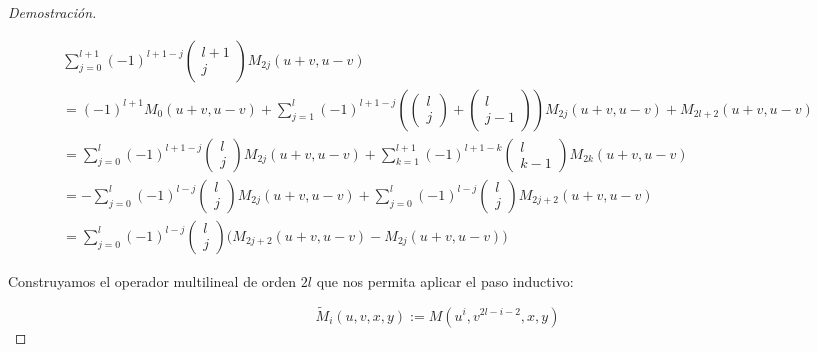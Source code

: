 \begin{proof}[Demostración]
	\begin{adjustwidth}{-7em}{0pt}
		\begin{center}
			\begin{align*}
				\sum_{j = 0}^{l+1} (-1)^{l+1-j} \begin{pmatrix}
					l+1\\
					j
				\end{pmatrix} M_{2j}(u+v,u-v) \\
				= (-1)^{l+1}M_0(u+v,u-v)+ \sum_{j = 1}^{l} (-1)^{l+1-j} (\begin{pmatrix}
					l\\
					j
				\end{pmatrix} +\begin{pmatrix}
					l\\
					j-1
				\end{pmatrix})M_{2j}(u+v,u-v)+M_{2l+2}(u+v,u-v)\\
				= \sum_{j = 0}^l (-1)^{l+1-j} \begin{pmatrix}
					l\\
					j
				\end{pmatrix} M_{2j}(u+v,u-v) + \sum_{k = 1}^{l+1} (-1)^{l+1-k} \begin{pmatrix}
					l\\
					k-1
				\end{pmatrix} M_{2k}(u+v,u-v)  \\
				= - \sum_{j = 0}^l (-1)^{l-j} \begin{pmatrix}
					l\\
					j
				\end{pmatrix} M_{2j}(u+v,u-v) + \sum_{j = 0}^{l} (-1)^{l-j} \begin{pmatrix}
					l\\
					j
				\end{pmatrix} M_{2j+2}(u+v,u-v)  \\
				=  \sum_{j = 0}^l (-1)^{l-j} \begin{pmatrix}
					l\\
					j
				\end{pmatrix} \bigg(M_{2j+2}(u+v,u-v)-M_{2j}(u+v,u-v) \bigg) 
			\end{align*}
		\end{center}
	\end{adjustwidth}
	
	Construyamos el operador multilineal de orden $2l$ que nos permita aplicar el paso inductivo:
	
	\begin{equation*}
		\tilde{M}_i(u,v,x,y) := M(u^i,v^{2l-i-2},x,y)
	\end{equation*}
	

\end{proof}
